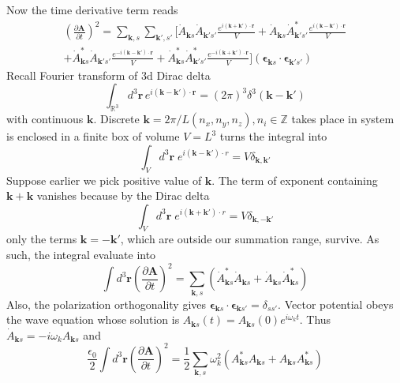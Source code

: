 \documentclass[../../../main.tex]{subfiles}
\begin{document}
Now the time derivative term reads
\begin{multline*}
  \left( \frac{\partial \mathbf A}{\partial t} \right)^2
  = \sum_{\mathbf k,s} \sum_{\mathbf k', s'} \bigg[
    \dot A_{\mathbf k s} \dot A_{\mathbf k' s'} \frac{e^{i (\mathbf k + \mathbf k') \cdot \mathbf r}}{V}
    + \dot A_{\mathbf k s} \dot A_{\mathbf k' s'}^* \frac{e^{i (\mathbf k - \mathbf k') \cdot \mathbf r}}{V}\\
    + \dot A_{\mathbf k s}^* \dot A_{\mathbf k' s'} \frac{e^{-i (\mathbf k - \mathbf k') \cdot \mathbf r}}{V}
    + \dot A_{\mathbf k s}^* \dot A_{\mathbf k' s'}^* \frac{e^{-i (\mathbf k + \mathbf k') \cdot \mathbf r}}{V}
    \bigg] (\boldsymbol\epsilon_{\mathbf k s} \cdot \boldsymbol\epsilon_{\mathbf k' s'})
\end{multline*}
Recall Fourier transform of 3d Dirac delta
\begin{equation*}
  \int_{\mathbb{R}^3} d^3 \mathbf{r} \, e^{i(\mathbf{k}-\mathbf{k}') \cdot \mathbf{r}} = (2\pi)^3 \delta^3(\mathbf{k}-\mathbf{k}')
\end{equation*}
with continuous $\mathbf{k}$.
Discrete $\mathbf{k}=2 \pi/L(n_x, n_y, n_z), n_i \in \mathbb{Z}$ takes place in system is enclosed in a finite box of volume $V=L^3$ turns the integral into
\begin{equation*}
  \int_V d^3 \mathbf{r} \;e^{i(\mathbf{k}-\mathbf{k}') \cdot r} = V \delta_{\mathbf{k},\mathbf{k}'}
\end{equation*}
Suppose earlier we pick positive value of $\mathbf{k}$.
The term of exponent containing $\mathbf{k} + \mathbf{k}$ vanishes because by the Dirac delta
\begin{equation*}
  \int_V d^3 \mathbf{r} \;e^{i(\mathbf{k}+\mathbf{k}') \cdot r} = V \delta_{\mathbf{k},-\mathbf{k}'}
\end{equation*}
only the terms $\mathbf{k}=-\mathbf{k}'$, which are outside our summation range, survive.
As such, the integral evaluate into
\begin{equation*}
  \int d^3 \mathbf{r} \left( \frac{\partial \mathbf{A}}{\partial t} \right)^2  = \sum_{\mathbf{k},s}  \left( \dot{A}_{\mathbf{k} s}^{*} \dot{A}_{\mathbf{k} s} + \dot{A}_{\mathbf{k} s} \dot{A}_{\mathbf{k} s}^{*} \right)
\end{equation*}
Also, the polarization orthogonality gives $\boldsymbol{\epsilon}_{\mathbf{k} s} \cdot \boldsymbol{\epsilon}_{\mathbf{k} s'} =\delta_{ss'}$.
Vector potential obeys the wave equation whose solution is $A_{\mathbf{k}s}(t)=A_{\mathbf{k}s}(0)e^{i\omega_kt}$.
Thus $\dot{A}_{\mathbf{k}s}=-i\omega_kA_{\mathbf{k}s}$ and
\begin{equation*}
  \frac{\epsilon_0 }{2 }\int d^3 \mathbf{r} \left( \frac{\partial \mathbf{A}}{\partial t} \right)^2
  =\frac{1 }{2} \sum_{\mathbf{k},s}  \omega_k^2 \left( {A}_{\mathbf{k} s}^{*} A_{\mathbf{k} s} + A_{\mathbf{k} s} A_{\mathbf{k} s}^{*} \right)
\end{equation*}
\end{document}
